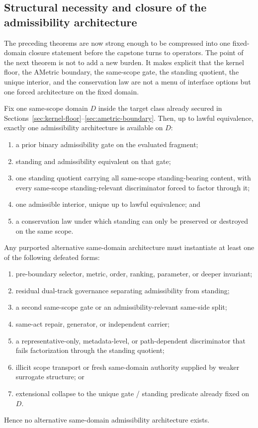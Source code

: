 \subsection{Structural necessity and closure of the admissibility architecture}

The preceding theorems are now strong enough to be compressed into one fixed-domain closure statement before the capstone turns to operators. The point of the next theorem is not to add a new burden. It makes explicit that the kernel floor, the AMetric boundary, the same-scope gate, the standing quotient, the unique interior, and the conservation law are not a menu of interface options but one forced architecture on the fixed domain.

\begin{theorem}
\label{thm:admissibility-architecture-closure}
Fix one same-scope domain $D$ inside the target class already secured in Sections~\ref{sec:kernel-floor}--\ref{sec:ametric-boundary}. Then, up to lawful equivalence, exactly one admissibility architecture is available on $D$:
\begin{enumerate}
  \item a prior binary admissibility gate on the evaluated fragment;
  \item standing and admissibility equivalent on that gate;
  \item one standing quotient carrying all same-scope standing-bearing content, with every same-scope standing-relevant discriminator forced to factor through it;
  \item one admissible interior, unique up to lawful equivalence; and
  \item a conservation law under which standing can only be preserved or destroyed on the same scope.
\end{enumerate}
Any purported alternative same-domain architecture must instantiate at least one of the following defeated forms:
\begin{enumerate}
  \item pre-boundary selector, metric, order, ranking, parameter, or deeper invariant;
  \item residual dual-track governance separating admissibility from standing;
  \item a second same-scope gate or an admissibility-relevant same-side split;
  \item same-act repair, generator, or independent carrier;
  \item a representative-only, metadata-level, or path-dependent discriminator that fails factorization through the standing quotient;
  \item illicit scope transport or fresh same-domain authority supplied by weaker surrogate structure; or
  \item extensional collapse to the unique gate / standing predicate already fixed on $D$.
\end{enumerate}
Hence no alternative same-domain admissibility architecture exists.
\end{theorem}

